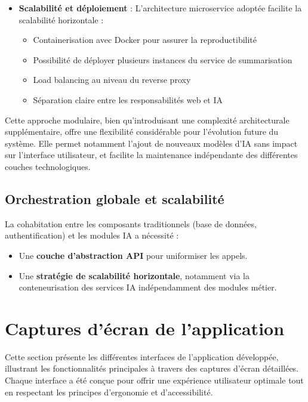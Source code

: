 \documentclass[12pt]{rapportPfe}
\begin{document}
\begin{itemize}
    \item \textbf{Scalabilité et déploiement} : L'architecture microservice adoptée facilite la scalabilité horizontale :
    \begin{itemize}
        \item Containerisation avec Docker pour assurer la reproductibilité
        \item Possibilité de déployer plusieurs instances du service de summarisation
        \item Load balancing au niveau du reverse proxy
        \item Séparation claire entre les responsabilités web et IA
    \end{itemize}
\end{itemize}

Cette approche modulaire, bien qu'introduisant une complexité architecturale supplémentaire, offre une flexibilité considérable pour l'évolution future du système. Elle permet notamment l'ajout de nouveaux modèles d'IA sans impact sur l'interface utilisateur, et facilite la maintenance indépendante des différentes couches technologiques.

\subsection{Orchestration globale et scalabilité}

La cohabitation entre les composants traditionnels (base de données, authentification) et les modules IA a nécessité :

\begin{itemize}
    \item Une \textbf{couche d’abstraction API} pour uniformiser les appels.
    \item Une \textbf{stratégie de scalabilité horizontale}, notamment via la conteneurisation des services IA indépendamment des modules métier.
\end{itemize}

\newpage	
\section{Captures d'écran de l'application}

Cette section présente les différentes interfaces de l'application développée, illustrant les fonctionnalités principales à travers des captures d'écran détaillées. Chaque interface a été conçue pour offrir une expérience utilisateur optimale tout en respectant les principes d'ergonomie et d'accessibilité.
\end{document}
